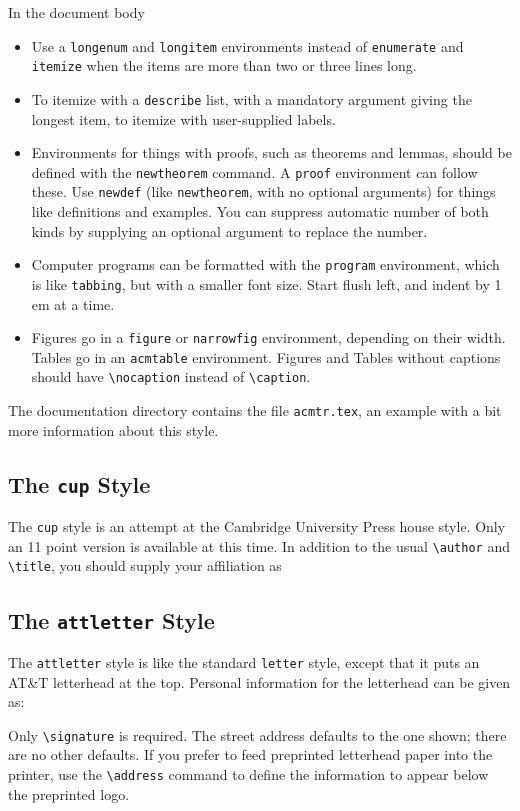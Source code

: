 In the document body
\begin{itemize}
\item
Use a \verb|longenum| and \verb|longitem| environments instead
of \verb|enumerate| and \verb|itemize| when
the items are more than two or three lines long.
\item
To itemize with a \verb|describe| list, with a mandatory argument giving the
longest item, to itemize with user-supplied labels.
\item
Environments for things with proofs, such as theorems and lemmas,
should be defined with the \verb|newtheorem| command.
A \verb|proof| environment can follow these.
Use \verb|newdef| (like \verb|newtheorem|, with no optional arguments)
for things like definitions and examples.  You can suppress automatic
number of both kinds by supplying an optional argument to replace
the number.
\item
Computer programs can be formatted with the \verb|program| environment,
which is like \verb|tabbing|, but with a smaller font size.
Start flush left, and indent by 1 em at a time.
\item
Figures go in a \verb|figure| or \verb|narrowfig| environment,
depending on their width.
Tables go in an \verb|acmtable| environment.
Figures and Tables without captions should have \verb|\nocaption|
instead of \verb|\caption|.
\end{itemize}

The documentation directory contains the file \verb|acmtr.tex|, an example
with a bit more information about this style.

\subsection{The {\tt cup} Style}

The {\tt cup} style is an attempt at the Cambridge University Press
house style.
Only an 11 point version is available at this time.
In addition to the usual \verb|\author| and \verb|\title|,
you should supply your affiliation as
\begin{eg}
\end{eg}


\subsection{The {\tt attletter} Style}

The {\tt attletter} style is like the standard {\tt letter} style,
except that it puts an AT\&T letterhead at the top.
Personal information for the letterhead can be given as:
\begin{eg}
\signature{Howard Trickey}
\end{eg}
Only \verb|\signature| is required.
The street address defaults to the one shown;
there are no other defaults.
If you prefer to feed preprinted letterhead paper into
the printer, use the \verb|\address| command to define
the information to appear below the preprinted logo.

